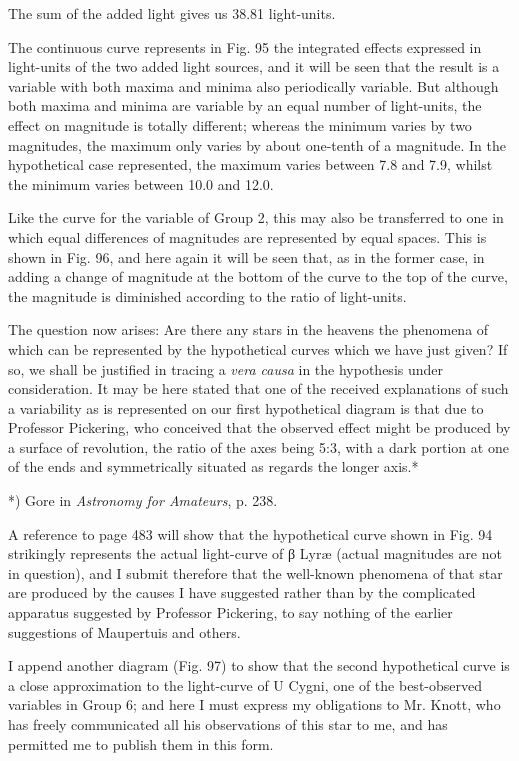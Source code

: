 \documentclass[a4paper, 12pt, oneside, polutonikogreek, english]{article}
\begin{document}
The sum of the added light gives us 38.81 light-units.

The continuous curve represents in Fig. 95 the integrated effects expressed in light-units of the two added light sources, and it will be seen that the result is a variable with both maxima and minima also periodically variable. But although both maxima and minima are variable by an equal number of light-units, the effect on magnitude is totally different; whereas the minimum varies by two magnitudes, the maximum only varies by about one-tenth of a magnitude. In the hypothetical case represented, the maximum varies between 7.8 and 7.9, whilst the minimum varies between 10.0 and 12.0.

Like the curve for the variable of Group 2, this may also be transferred to one in which equal differences of magnitudes are represented by equal spaces. This is shown in Fig. 96, and here again it will be seen that, as in the former case, in adding a change of magnitude at the bottom of the curve to the top of the curve, the magnitude is diminished according to the ratio of light-units.

The question now arises: Are there any stars in the heavens the phenomena of which can be represented by the hypothetical curves which we have just given? If so, we shall be justified in tracing a \emph{vera causa} in the hypothesis under consideration. It may be here stated that one of the received explanations of such a variability as is represented on our first hypothetical diagram is that due to Professor Pickering, who conceived that the observed effect might be produced by a surface of revolution, the ratio of the axes being 5:3, with a dark portion at one of the ends and symmetrically situated as regards the longer axis.*

*) Gore in \emph{Astronomy for Amateurs}, p. 238.

A reference to page 483 will show that the hypothetical curve shown in Fig. 94 strikingly represents the actual light-curve of β Lyræ (actual magnitudes are not in question), and I submit therefore that the well-known phenomena of that star are produced by the causes I have suggested rather than by the complicated apparatus suggested by Professor Pickering, to say nothing of the earlier suggestions of Maupertuis and others.

I append another diagram (Fig. 97) to show that the second hypothetical curve is a close approximation to the light-curve of U Cygni, one of the best-observed variables in Group 6; and here I must express my obligations to Mr. Knott, who has freely communicated all his observations of this star to me, and has permitted me to publish them in this form.
\end{document}
